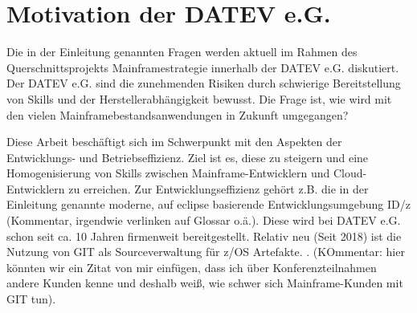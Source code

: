 \chapter{Motivation der DATEV e.G.}\label{ch:Firmenkontext}
Die in der Einleitung genannten Fragen werden aktuell im Rahmen des Querschnittsprojekts \glqq Mainframestrategie\grqq{} innerhalb der DATEV e.G. diskutiert. 
Der DATEV e.G. sind die zunehmenden Risiken durch schwierige Bereitstellung von Skills und der Herstellerabhängigkeit bewusst. 
Die Frage ist, wie wird mit den vielen Mainframebestandsanwendungen in Zukunft umgegangen?


Diese Arbeit beschäftigt sich im Schwerpunkt mit den Aspekten der Entwicklungs- und Betriebseffizienz. 
Ziel ist es, diese zu steigern und eine Homogenisierung von Skills zwischen Mainframe-Entwicklern und Cloud-Entwicklern zu erreichen. 
Zur Entwicklungseffizienz gehört z.B. die in der Einleitung genannte moderne, auf eclipse basierende Entwicklungsumgebung ID/z (Kommentar, irgendwie verlinken auf Glossar o.ä.).
Diese wird bei DATEV e.G. schon seit ca. 10 Jahren firmenweit bereitgestellt.
Relativ neu (Seit 2018) ist die Nutzung von GIT als Sourceverwaltung für z/OS Artefakte. . (KOmmentar: hier könnten wir ein Zitat von mir einfügen, dass ich über Konferenzteilnahmen andere Kunden kenne und deshalb weiß, wie schwer sich Mainframe-Kunden mit GIT tun). 





